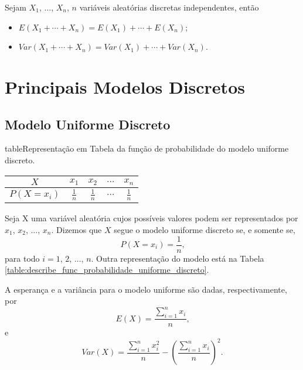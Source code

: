 \begin{theorem}
	Sejam $X_1$, $\dots$, $X_n$, $n$ variáveis aleatórias discretas independentes, então
	\begin{itemize}
		\item $E(X_1 + \cdots + X_n)=E(X_1) + \cdots + E(X_n)$;
		\item $Var(X_1 + \cdots + X_n)=Var(X_1) + \cdots + Var(X_n)$.
	\end{itemize}
\end{theorem}

\section{Principais Modelos Discretos}

\subsection{Modelo Uniforme Discreto}

\begin{sidepicture}{2cm}{table}{Representação em Tabela da função de probabilidade do modelo uniforme discreto.}
	\label{table:describe_func_probabilidade_uniforme_discreto}
	\begin{tabular}{c|cccc}\toprule  
		$X$ & $x_1$ & $x_2$ & $\dots$ & $x_n$ \\ \midrule
		$P(X=x_i)$ & $\frac{1}{n}$ & $\frac{1}{n}$ & $\dots$ & $\frac{1}{n}$\\\bottomrule
	\end{tabular}
\end{sidepicture}

Seja X uma variável aleatória cujos possíveis valores podem ser representados por $x_1$, $x_2$, $\dots$, $x_n$. Dizemos que $X$ segue o modelo uniforme discreto se, e somente se,
\begin{equation}
	P(X=x_i)=\frac{1}{n}\text{,}
\end{equation}
para todo $i=1$, $2$, $\dots$, $n$. Outra representação do modelo está na Tabela \ref{table:describe_func_probabilidade_uniforme_discreto}.

A esperança e a variância para o modelo uniforme são dadas, respectivamente, por
\begin{equation}
	E(X)=\frac{\displaystyle\sum_{i=1}^{n}x_i}{n}\text{,}
\end{equation}
e
\begin{equation}
	Var(X)=\frac{\displaystyle\sum_{i=1}^{n} x_i^2}{n} - \left (
		\frac{\sum_{i=1}^{n} x_i}{n}
	\right )^2\text{.}
\end{equation}

